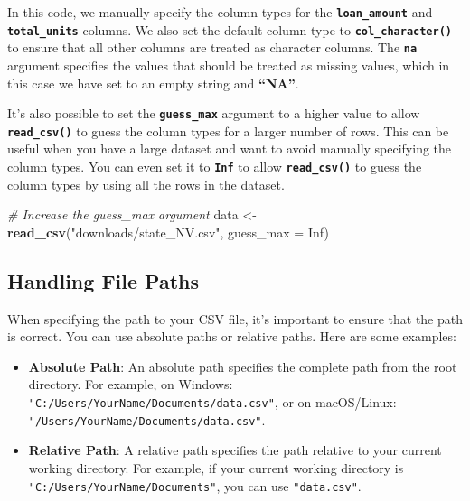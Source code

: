 \documentclass[
]{book}
\newenvironment{Shaded}{\begin{snugshade}}{\end{snugshade}}
\newcommand{\AttributeTok}[1]{\textcolor[rgb]{0.13,0.29,0.53}{#1}}
\newcommand{\CommentTok}[1]{\textcolor[rgb]{0.56,0.35,0.01}{\textit{#1}}}
\newcommand{\ConstantTok}[1]{\textcolor[rgb]{0.56,0.35,0.01}{#1}}
\newcommand{\FunctionTok}[1]{\textcolor[rgb]{0.13,0.29,0.53}{\textbf{#1}}}
\newcommand{\NormalTok}[1]{#1}
\newcommand{\OtherTok}[1]{\textcolor[rgb]{0.56,0.35,0.01}{#1}}
\newcommand{\StringTok}[1]{\textcolor[rgb]{0.31,0.60,0.02}{#1}}
\providecommand{\tightlist}{%
  \setlength{\itemsep}{0pt}\setlength{\parskip}{0pt}}
\begin{document}
In this code, we manually specify the column types for the \textbf{\texttt{loan\_amount}} and \textbf{\texttt{total\_units}} columns. We also set the default column type to \textbf{\texttt{col\_character()}} to ensure that all other columns are treated as character columns. The \textbf{\texttt{na}} argument specifies the values that should be treated as missing values, which in this case we have set to an empty string and \textbf{``NA''}.

It's also possible to set the \textbf{\texttt{guess\_max}} argument to a higher value to allow \textbf{\texttt{read\_csv()}} to guess the column types for a larger number of rows. This can be useful when you have a large dataset and want to avoid manually specifying the column types. You can even set it to \textbf{\texttt{Inf}} to allow \textbf{\texttt{read\_csv()}} to guess the column types by using all the rows in the dataset.

\begin{Shaded}
\begin{Highlighting}[]
\CommentTok{\# Increase the guess\_max argument}
\NormalTok{data }\OtherTok{\textless{}{-}} \FunctionTok{read\_csv}\NormalTok{(}\StringTok{"downloads/state\_NV.csv"}\NormalTok{, }\AttributeTok{guess\_max =} \ConstantTok{Inf}\NormalTok{)}
\end{Highlighting}
\end{Shaded}

\hypertarget{handling-file-paths}{%
\subsection{Handling File Paths}\label{handling-file-paths}}

When specifying the path to your CSV file, it's important to ensure that the path is correct. You can use absolute paths or relative paths. Here are some examples:

\begin{itemize}
\tightlist
\item
  \textbf{Absolute Path}: An absolute path specifies the complete path from the root directory. For example, on Windows: \texttt{"C:/Users/YourName/Documents/data.csv"}, or on macOS/Linux: \texttt{"/Users/YourName/Documents/data.csv"}.
\item
  \textbf{Relative Path}: A relative path specifies the path relative to your current working directory. For example, if your current working directory is \texttt{"C:/Users/YourName/Documents"}, you can use \texttt{"data.csv"}.
\end{itemize}
\end{document}
